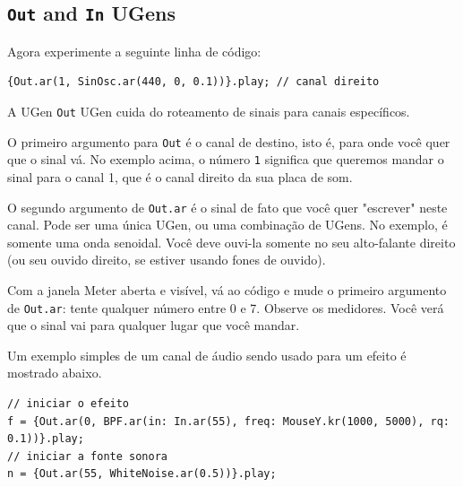 \subsection{\texttt{Out} and \texttt{In} UGens}

Agora experimente a seguinte linha de código:

\begin{lstlisting}[style=SuperCollider-IDE, basicstyle=\scttfamily\footnotesize]
{Out.ar(1, SinOsc.ar(440, 0, 0.1))}.play; // canal direito
\end{lstlisting}

A UGen \texttt{Out} UGen cuida do roteamento de sinais para canais específicos.

O primeiro argumento para \texttt{Out} é o canal de destino, isto é, para onde você quer que o sinal vá. No exemplo acima, o número \texttt{1} significa que queremos mandar o sinal para o canal 1, que é o canal direito da sua placa de som.

O segundo argumento de \texttt{Out.ar} é o sinal de fato que você quer "escrever" neste canal. Pode ser uma única UGen, ou uma combinação de UGens. No exemplo, é somente uma onda senoidal. Você deve ouvi-la somente no seu alto-falante direito (ou seu ouvido direito, se estiver usando fones de ouvido).

Com a janela Meter aberta e visível, vá ao código e mude o primeiro argumento de \texttt{Out.ar}: tente qualquer número entre 0 e 7. Observe os medidores. Você verá que o sinal vai para qualquer lugar que você mandar.

\bigskip
{}
\bigskip

Um exemplo simples de um canal de áudio sendo usado para um efeito é mostrado abaixo.

\begin{lstlisting}[style=SuperCollider-IDE, basicstyle=\scttfamily\footnotesize]
// iniciar o efeito
f = {Out.ar(0, BPF.ar(in: In.ar(55), freq: MouseY.kr(1000, 5000), rq: 0.1))}.play;
// iniciar a fonte sonora
n = {Out.ar(55, WhiteNoise.ar(0.5))}.play;
\end{lstlisting}

